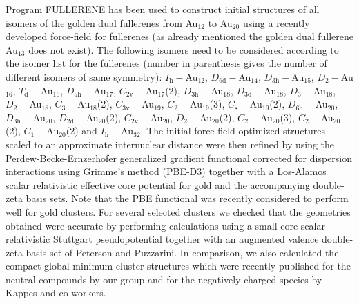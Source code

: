 Program FULLERENE\autocite{Schwerdtfeger_Programfullerenesoftware_2013} has
been used to construct initial structures of all isomers of the golden dual
fullerenes from Au$_{12}$ to Au$_{20}$ using a recently developed force-field
for fullerenes\autocite{Wirz_smallfullerenesgraphene_2015} (as already
mentioned the golden dual fullerene Au$_{13}$ does not exist). The following
isomers need to be considered according to the isomer list for the fullerenes
(number in parenthesis gives the number of different isomers of same
symmetry):\autocite{Brinkmann_HouseGraphsdatabase_2013,Schwerdtfeger_Programfullerenesoftware_2013}
$I_\mathrm{h}-$Au$_{12}$, $D_\mathrm{6d}-$Au$_{14}$, $D_\mathrm{3h}-$Au$_{15}$,
$D_\mathrm{2}-$Au$_{16}$, $T_\mathrm{d}-$Au$_{16}$, $D_\mathrm{5h}-$Au$_{17}$,
$C_\mathrm{2v}-$Au$_{17}$(2), $D_\mathrm{3h}-$Au$_{18}$,
$D_\mathrm{3d}-$Au$_{18}$, $D_\mathrm{3}-$Au$_{18}$, $D_\mathrm{2}-$Au$_{18}$,
$C_\mathrm{3}-$Au$_{18}$(2), $C_\mathrm{3v}-$Au$_{19}$,
$C_\mathrm{2}-$Au$_{19}$(3), $C_\mathrm{s}-$Au$_{19}$(2),
$D_\mathrm{6h}-$Au$_{20}$, $D_\mathrm{3h}-$Au$_{20}$,
$D_\mathrm{2d}-$Au$_{20}$(2), $C_\mathrm{2v}-$Au$_{20}$,
$D_\mathrm{2}-$Au$_{20}$(2), $C_\mathrm{2}-$Au$_{20}$(3),
$C_\mathrm{2}-$Au$_{20}$(2), $C_\mathrm{1}-$Au$_{20}$(2) and
$I_\mathrm{h}-$Au$_{32}$. The initial force-field optimized structures scaled
to an approximate internuclear distance were then refined by using the
Perdew-Becke-Ernzerhofer generalized gradient
functional\autocite{Perdew_GeneralizedGradientApproximation_1996,PerdewGeneralizedGradientApproximation1997}
corrected for dispersion interactions using Grimme's method
(PBE-D3)\autocite{Grimme_consistentaccurateinitio_2010,Grimme_Effectdampingfunction_2011}
together with a Los-Alamos scalar relativistic effective core potential for
gold and the accompanying double-zeta basis sets.\autocite{Wadt1985} Note that
the PBE functional was recently considered to perform well for gold
clusters.\autocite{Mancera_alternativemethodologyassess_2015} For several
selected clusters we checked that the geometries obtained were accurate by
performing calculations using a small core scalar relativistic Stuttgart
pseudopotential\autocite{Figgen_Energyconsistentpseudopotentialsgroup_2005}
together with an augmented valence double-zeta basis set of Peterson and
Puzzarini.\autocite{Peterson-2005} In comparison, we also calculated the
compact global minimum cluster structures which were recently published for the
neutral compounds by our
group\autocite{Assadollahzadeh_systematicsearchminimum_2009} and for the
negatively charged species by Kappes and
co-workers.\autocite{Schooss_Determiningsizedependentstructure_2010,Lechtken_Structuredeterminationgold_2009}

